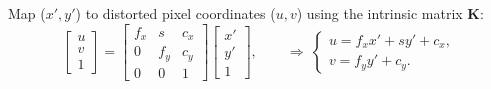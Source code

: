 \documentclass{erauthesis}
\begin{document}
Map ($x', y'$) to distorted pixel coordinates ($u,v$) using the intrinsic matrix $\mathbf{K}$:
\begin{equation}
\begin{bmatrix} u \\ v \\ 1 \end{bmatrix}
=
\begin{bmatrix}
f_x & s & c_x \\
0   & f_y & c_y \\
0   & 0   & 1
\end{bmatrix}
\begin{bmatrix} x' \\ y' \\ 1 \end{bmatrix},
\qquad
\Rightarrow\ 
\begin{cases}
u = f_x x' + s y' + c_x,\\
v = f_y y' + c_y.
\end{cases}
\label{eq:intrinsics_to_pixels}
\end{equation}


%        
\end{document}
